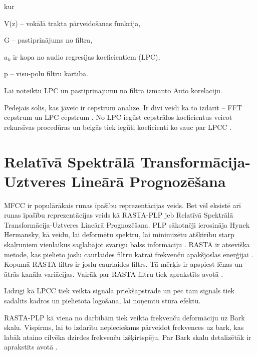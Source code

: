 \documentclass[12pt,paper=A4]{report}
\begin{document}
kur 

V(z) – vokālā trakta pārveidošanas funkcija, 

G – pastiprinājums no filtra, 

$a_k$ ir kopa no audio regresijas koeficientiem (LPC),

p – visu-polu filtru kārtība. 

Lai noteiktu LPC un pastiprinājumu no filtra izmanto Auto korelāciju. 

Pēdējais solis, kas jāveic ir cepstrum analīze. Ir divi veidi kā to izdarīt – FFT cepstrum \cite{fft} un LPC cepstrum \cite{lpcc}. No LPC iegūst cepstrālos koeficientus veicot rekursīvas procedūras un beigās tiek iegūti koeficienti ko sauc par LPCC \cite{http://citeseerx.ist.psu.edu/viewdoc/download?doi=10.1.1.800.1305&rep=rep1&type=pdf}. 



\section{Relatīvā Spektrālā Transformācija-Uztveres Lineārā Prognozēšana}
 

MFCC ir populārākais runas īpašību reprezentācijas veids. Bet vēl eksistē arī runas īpašību reprezentācijas veids kā RASTA-PLP jeb 
Relatīvā Spektrālā Transformācija-Uztveres Lineārā Prognozēšana. 
PLP sākotnēji ierosināja Hynek Hermansky, kā veidu, lai deformētu spektru, lai
minimizētu atšķirību starp skaļruņiem vienlaikus saglabājot svarīgu balss informāciju \cite{H2}.
RASTA ir atsevišķa metode, kas pielieto joslu caurlaides filtru katrai frekvenču
apakšjoslas enerģijai \cite{H1}.
Kopumā RASTA filtrs ir joslu caurlaides filtrs. Tā mērķis ir apspiest lēnas un ātrās kanāla variācijas. Vairāk par RASTA filtru tiek aprakstīts avotā \cite{H1}.

Līdzīgi kā LPCC tiek veikta signāla priekšapstrāde un pēc tam signāls tiek sadalīts kadros un pielietota logošana, lai noņemtu stūra efektu.



RASTA-PLP kā viena no darbībām tiek veikta frekvenču deformāciju uz Bark skalu. Vispirms, lai to izdarītu nepieciešams
pārveidot frekvences uz bark, kas labāk ataino cilvēka dzirdes frekvenču izšķirtspēju.
Par Bark skalu detalizētāk ir aprakstīts avotā \cite{https://ccrma.stanford.edu/courses/120-fall-2003/lecture-5.html}.  

\end{document}
